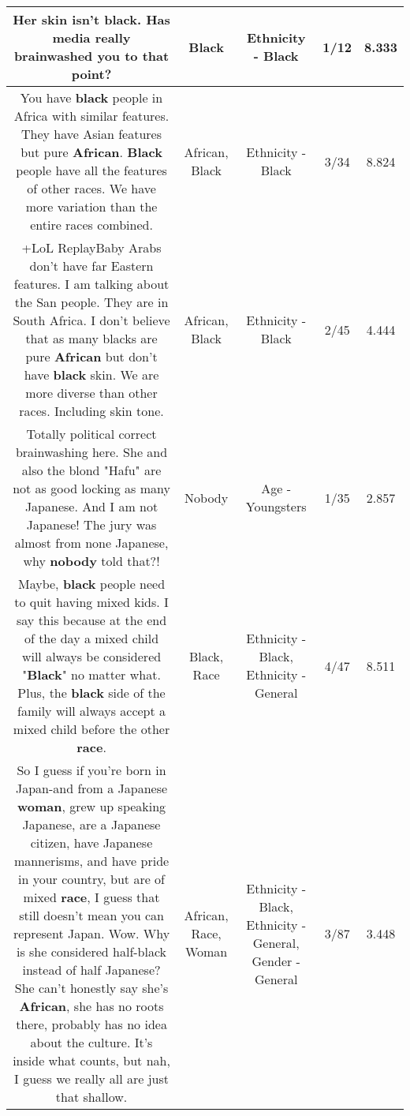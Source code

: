 \documentclass[11pt]{article}
\newlength\mylength
\begin{document}
\begin{center}
\begin{longtable}{|C{.65\mylength}|C{.30\mylength}|C{.12\mylength}|C{.12\mylength}|C{.12\mylength}|}
  \small Her skin isn't \textbf{black}. Has media really brainwashed you to that point?\normalsize   & Black & Ethnicity - Black & 1/12 & 8.333 \\  \hline
  \small You have \textbf{black} people in Africa with similar features. They have Asian features but pure \textbf{African}. \textbf{Black} people have all the features of other races. We have more variation than the entire races combined.\normalsize   & African, Black & Ethnicity - Black & 3/34 & 8.824 \\  \hline
  \small +LoL ReplayBaby Arabs don't have far Eastern features. I am talking about the San people. They are in South Africa. I don't believe that as many blacks are pure \textbf{African} but don't have \textbf{black} skin. We are more diverse than other races. Including skin tone.\normalsize   & African, Black & Ethnicity - Black & 2/45 & 4.444 \\  \hline
  \small Totally political correct brainwashing here. She and also the blond "Hafu" are not as good locking as many Japanese. And I am not Japanese! The jury was almost from none Japanese, why \textbf{nobody} told that?!\normalsize   & Nobody & Age - Youngsters & 1/35 & 2.857 \\  \hline
  \small Maybe, \textbf{black} people need to quit having mixed kids. I say this because at the end of the day a mixed child will always be considered "\textbf{Black}" no matter what. Plus, the \textbf{black} side of the family will always accept a mixed child before the other \textbf{race}.\normalsize   & Black, Race & Ethnicity - Black, Ethnicity - General & 4/47 & 8.511 \\  \hline
  \small So I guess if you're born in Japan-and from a Japanese \textbf{woman}, grew up speaking Japanese, are a Japanese citizen, have Japanese mannerisms, and have pride in your country, but are of mixed \textbf{race}, I guess that still doesn't mean you can represent Japan. Wow. Why is she considered half-black instead of half Japanese? She can't honestly say she's \textbf{African}, she has no roots there, probably has no idea about the culture. It's inside what counts, but nah, I guess we really all are just that shallow.\normalsize   & African, Race, Woman & Ethnicity - Black, Ethnicity - General, Gender - General & 3/87 & 3.448 \\  \hline

\end{longtable}
\end{center}
\end{document}
